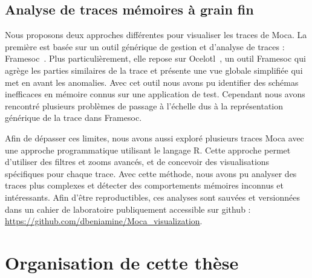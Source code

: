 \subsection*{Analyse de traces mémoires à grain fin}

Nous proposons deux approches différentes pour visualiser les traces de \gls{Moca}.
La première est basée sur un outil générique de gestion et d'analyse de traces : \gls{Framesoc}~\cite{Pagano14frameSoC}.
Plus particulièrement, elle repose sur \gls{Ocelotl}~\cite{Dosimont14Ocelotl}, un outil \gls{Framesoc} qui agrège les parties similaires de la trace et présente une vue globale simplifiée qui met en avant les anomalies.
Avec cet outil nous avons pu identifier des schémas inefficaces en mémoire connus sur une application de test.
Cependant nous avons rencontré plusieurs problèmes de passage à l'échelle dus à la représentation générique de la trace dans \gls{Framesoc}.

Afin de dépasser ces limites, nous avons aussi exploré plusieurs traces \gls{Moca} avec une approche programmatique utilisant le langage \gls{R}.
Cette approche permet d'utiliser des filtres et zooms avancés, et de concevoir des visualisations spécifiques pour chaque trace.
Avec cette méthode, nous avons pu analyser des traces plus complexes et détecter des comportements mémoires inconnus et intéressants.
Afin d'être reproductibles, ces analyses sont sauvées et versionnées dans un cahier de laboratoire publiquement accessible sur github :\\
\url{https://github.com/dbeniamine/Moca_visualization}.

\section*{Organisation de cette thèse}

